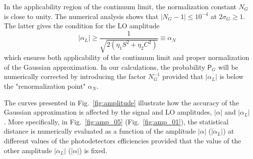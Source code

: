 \documentclass[%
reprint,
superscriptaddress,
 amsmath,amssymb,amsfonts,
 aps,
 pra,
 longbibliography
]{revtex4-2}
\newcommand{\prob}{\mathsf{P}}
\begin{document}
In the applicability region of
the continuum limit, the normalization constant $N_G$
is close to unity. The numerical analysis shows that
$|N_G-1|\le 10^{-4}$ at $ 2\sigma_{G}\ge 1$.
The latter gives the condition for the LO amplitude
\begin{equation}
    |\alpha_L|\geq \frac{1}{\sqrt{2(\eta_1S^2+\eta_2C^2)}}\equiv\alpha_N
    \label{eq:renorm}
  \end{equation}
   which ensures both applicability of the continuum limit
  and proper normalization of the Gaussian approximation.
  In our calculations,
the probability $\prob_G$ will be numerically corrected by introducing
the factor $N_G^{-1}$
provided that $|\alpha_L|$ is below the "renormalization point" $\alpha_N$.


  The curves presented in Fig.~\ref{fig:amplitude}
  illustrate how the accuracy of the Gaussian approximation
  is affected by the signal and LO amplitudes, $|\alpha|$ and $|\alpha_L|$.
  More specifically, in
Fig.~\ref{fig:amp_05} (Fig.~\ref{fig:amp_01}),
  the statistical distance is numerically evaluated as a function
  of the amplitude $|\alpha|$ ($|\alpha_L|$)
at different values of the photodetectors efficiencies
provided that the value of
the other amplitude $|\alpha_L|$ ($|\alpha|$) is fixed.
\end{document}

